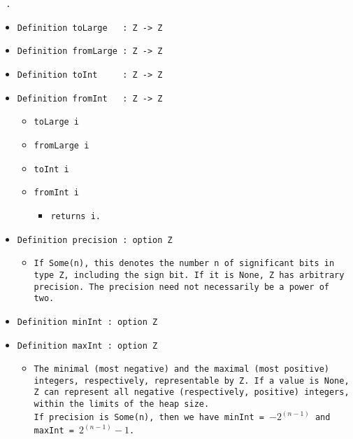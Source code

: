 \documentclass[11pt]{report}
\begin{document}
\begin{coqdoccode}
\coqdocemptyline
\coqdocnoindent
\texttt{ .\coqdoceol}
\coqdocemptyline
\end{coqdoccode}



\begin{itemize}
\item  \texttt{Definition toLarge \ \  : Z -> Z}

\item  \texttt{Definition fromLarge : Z -> Z}

\item  \texttt{Definition toInt \ \ \ \ : Z -> Z}

\item  \texttt{Definition fromInt \ \ : Z -> Z}

\begin{itemize}
\item  \texttt{toLarge i}
\item  \texttt{fromLarge i}
\item  \texttt{toInt i}
\item  \texttt{fromInt i}

\begin{itemize}
\item  \texttt{returns i.}
\end{itemize}

\end{itemize}

\item  \texttt{Definition precision : option Z}

\begin{itemize}
\item  \begin{flushleft} \texttt{If Some(n), this denotes the number n of significant bits in type Z, including the sign bit. If it is None, Z has arbitrary precision. The precision need not necessarily be a power of two. } \end{flushleft}
\end{itemize}

\item  \texttt{Definition minInt : option Z}

\item  \texttt{Definition maxInt : option Z}

\begin{itemize}
\item \begin{flushleft} \texttt{The minimal (most negative) and the maximal (most positive) integers, respectively, representable by Z. If a value is None, Z can represent all negative (respectively, positive) integers, within the limits of the heap size.\\
If precision is Some(n), then we have minInt = $-2^{(n-1)}$ and maxInt = $2^{(n-1)} - 1$.} \end{flushleft}
\end{itemize}


\end{itemize}
\end{document}
